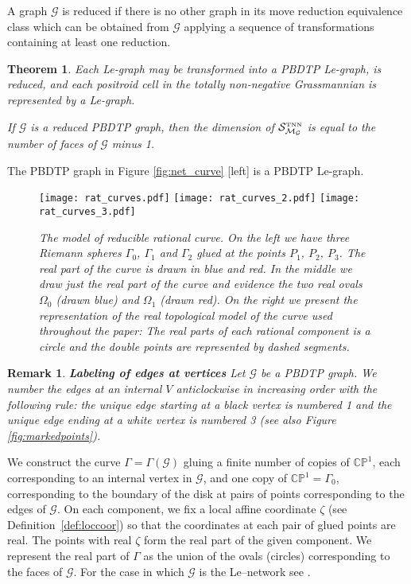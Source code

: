 \documentclass[11pt]{amsart}
\theoremstyle{plain}
\numberwithin{equation}{section}
\newtheorem{theorem}{Theorem}[subsection]
\newtheorem{remark}{Remark}[subsection]
\begin{document}
A graph  $\mathcal G$ is reduced if there is no other graph in its move reduction equivalence class which can be obtained from $\mathcal G$ applying a sequence of transformations containing at least one reduction.

\begin{theorem}
Each Le-graph may be transformed into a PBDTP Le-graph, is reduced, and each positroid cell in the totally non-negative Grassmannian is represented by a Le-graph. 

If $\mathcal G$ is a reduced  PBDTP graph, then the dimension of  $\mathcal S^{\mbox{\tiny TNN}}_{\mathcal M_{\mathcal G}}$ is equal to the number of faces of $\mathcal G$ minus 1.
\end{theorem}

The PBDTP graph in Figure \ref{fig:net_curve} [left] is a PBDTP Le-graph.

\begin{figure}%
  \centering
  {\texttt{[image: rat\_curves.pdf]}}\hspace{1cm}
  {\texttt{[image: rat\_curves\_2.pdf]}}\hspace{1cm}
  {\texttt{[image: rat\_curves\_3.pdf]}}
  \caption{\label{fig:curve_model}\small{\sl The model of reducible rational curve. On the left we have three Riemann spheres $\Gamma_0$, $\Gamma_1$ and $\Gamma_2$ glued at the points $P_1$, $P_2$, $P_3$. The real part of the curve is drawn in blue and red. In the middle we draw just the real part of the curve and evidence the two real ovals $\Omega_0$ (drawn blue) and $\Omega_1$ (drawn red). On the right we present the representation of the real topological model of the curve used throughout the paper: The real parts of each rational component is a circle and the double points are represented by dashed segments.}}
\end{figure}

\begin{remark}\label{rem:labedges}\textbf{Labeling of edges at vertices}
Let ${\mathcal G}$ be a PBDTP graph. We number the edges at an internal $V$ anticlockwise in increasing order with the following rule: the unique edge starting at a black vertex is numbered 1 and the unique edge ending at a white vertex is numbered 3 (see also Figure \ref{fig:markedpoints}). 
\end{remark}

We construct the curve $\Gamma=\Gamma({\mathcal G})$ gluing a finite number of copies of $\mathbb{CP}^1$, each corresponding to an internal vertex in ${\mathcal G}$, and one copy of $\mathbb{CP}^1=\Gamma_0$, corresponding to the boundary of the disk at pairs of points corresponding to the edges of ${\mathcal G}$. 
On each component, we fix a local affine coordinate $\zeta$ (see Definition~\ref{def:loccoor}) so that  the coordinates at each pair of glued points are real. The points with real $\zeta$ form the real part of the given component. We represent the real part of $\Gamma$ as the union of the ovals (circles) corresponding to the faces of ${\mathcal G}$.
For the case in which $\mathcal G$ is the Le--network see \cite{AG3}.
\end{document}

